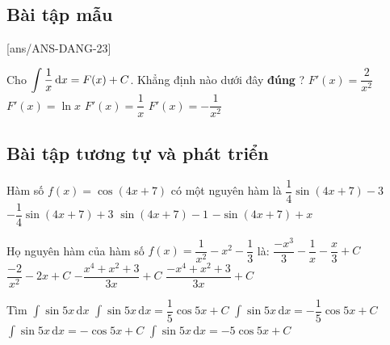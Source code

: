 \subsection{Bài tập mẫu}
[ans/ANS-DANG-23]
\begin{khung}
	\begin{vd}%
			Cho $\displaystyle\displaystyle\int\dfrac{1}{x}\mathrm{\,d}x=F(x)+C$. Khẳng định nào dưới đây \textbf{đúng} ?
		\choice
		{$F'(x)=\dfrac{2}{x^2}$}
		{$F'(x)=\ln x$}
		{\True $F'(x)=\dfrac{1}{x}$}
		{$F'(x)=-\dfrac{1}{x^2}$}
	\end{vd}
\end{khung}
\subsection{Bài tập tương tự và phát triển}
\begin{ex}%
	Hàm số $ f(x)=\cos\left(4x+7\right)$ có một nguyên hàm là
	\choice
	{\True $\dfrac{1}{4}\sin\left(4x+7\right)-3$}
	{$-\dfrac{1}{4}\sin\left(4x+7\right)+3$}
	{$\sin\left(4x+7\right)-1$}
	{$-\sin\left(4x+7\right)+x$}
\end{ex}

\begin{ex}%
	Họ nguyên hàm của hàm số $ f(x)=\dfrac{1}{x^2}-x^2-\dfrac{1}{3}$ là:
	\choice
	{\True $\dfrac{-x^3}{3}-\dfrac{1}{x}-\dfrac{x}{3}+C$}
	{$\dfrac{-2}{x^2}-2x+C$}
	{$-\dfrac{x^4+x^2+3}{3x}+C$}
	{$\dfrac{-x^4+x^2+3}{3x}+C$}
\end{ex}

\begin{ex}%
	Tìm $\displaystyle\int \sin 5x\mathrm{\,d}x$
	\choice
	{\True $\displaystyle\int \sin 5x\mathrm{\,d}x=\dfrac{1}{5}\cos 5x+C$}
	{$\displaystyle\int \sin 5x\mathrm{\,d}x=-\dfrac{1}{5}\cos 5x+C$}
	{$\displaystyle\int \sin 5x\mathrm{\,d}x=-\cos 5x+C$}
	{$\displaystyle\int \sin 5x\mathrm{\,d}x=-5\cos 5x+C$}
\end{ex}

